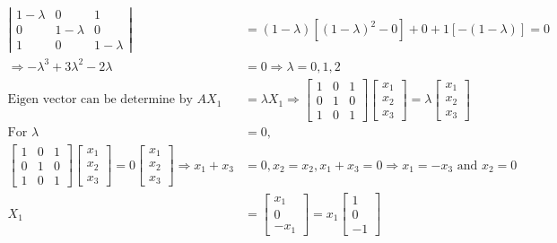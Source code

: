 \begin{enumerate}
\begin{answer}
\begin{align*}
\left|\begin{array}{ccc}1-\lambda & 0 & 1 \\ 0 & 1-\lambda & 0 \\ 1 & 0 & 1-\lambda\end{array}\right|&=(1-\lambda)\left[(1-\lambda)^{2}-0\right]+0+1[-(1-\lambda)]=0\\
\Rightarrow-\lambda^{3}+3 \lambda^{2}-2 \lambda&=0 \Rightarrow \lambda=0,1,2\\
\text{Eigen vector can be determine by }A X_{1}&=\lambda X_{1} \Rightarrow\left[\begin{array}{lll}1 & 0 & 1 \\ 0 & 1 & 0 \\ 1 & 0 & 1\end{array}\right]\left[\begin{array}{l}x_{1} \\ x_{2} \\ x_{3}\end{array}\right]=\lambda\left[\begin{array}{l}x_{1} \\ x_{2} \\ x_{3}\end{array}\right]\\
\text{For }\lambda&=0,\\
\left[\begin{array}{lll}1 & 0 & 1 \\ 0 & 1 & 0 \\ 1 & 0 & 1\end{array}\right]\left[\begin{array}{l}x_{1} \\ x_{2} \\ x_{3}\end{array}\right]=0\left[\begin{array}{l}x_{1} \\ x_{2} \\ x_{3}\end{array}\right] \Rightarrow x_{1}+x_{3}&=0, x_{2}=x_{2}, x_{1}+x_{3}=0 \Rightarrow x_{1}=-x_{3}\text{ and }x_{2}=0\\
X_{1}&=\left[\begin{array}{c}x_{1} \\ 0 \\ -x_{1}\end{array}\right]=x_{1}\left[\begin{array}{c}1 \\ 0 \\ -1\end{array}\right]\\

\end{align*}
\end{answer}
\end{enumerate}
